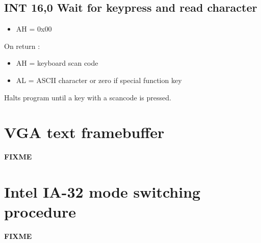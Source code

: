 \subsection{INT 16,0 Wait for keypress and read character}
\begin{itemize}
  \item{AH = 0x00}
\end{itemize}

On return :

\begin{itemize}
  \item{AH = keyboard scan code}
  \item{AL = ASCII character or zero if special function key}
\end{itemize}

Halts program until a key with a scancode is pressed.

%
%
\newpage
\section{VGA text framebuffer}
\textbf{FIXME}

%
%

\newpage
\section{Intel IA-32 mode switching procedure}
\textbf{FIXME}




